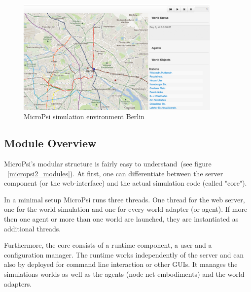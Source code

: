 \begin{figure}[h]
  \centering
    \includegraphics[width=10cm]{graphics/mp2_berlin}
  \caption{MicroPsi simulation environment Berlin}
  \label{mp2_berlin}
\end{figure}

        \subsection{Module Overview}
MicroPsi's modular structure is fairly easy to understand~(see figure ~\ref{micropsi2_modules}). At first, one can differentiate between the server component (or the web-interface) and the actual simulation code (called "core").

In a minimal setup MicroPsi runs three threads. One thread for the web server, one for the world simulation and one for every world-adapter (or agent). If more then one agent or more than one world are launched, they are instantiated as additional threads.

Furthermore, the core consists of a runtime component, a user and a configuration manager. The runtime works independently of the server and can also by deployed for command line interaction or other GUIs. It manages the simulations worlds as well as the agents (node net embodiments) and the world-adapters.~\cite{conf/agi/Bach12}
\\          
          
